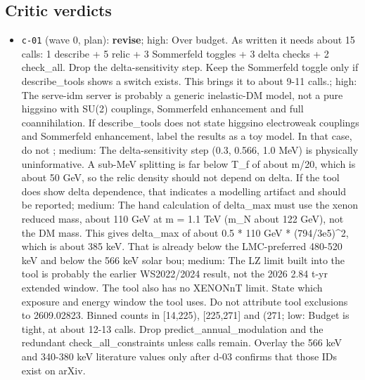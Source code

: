 \documentclass[11pt,a4paper]{article}
\begin{document}
\subsection{Critic verdicts}
\begin{itemize}
  \item \texttt{c-01} (wave 0, plan): \textbf{revise}; high: Over budget. As written it needs about 15 calls: 1 describe + 5 relic + 3 Sommerfeld toggles + 3 delta checks + 2 check\_all. Drop the delta-sensitivity step. Keep the Sommerfeld toggle only if describe\_tools shows a switch exists. This brings it to about 9-11 calls.; high: The serve-idm server is probably a generic inelastic-DM model, not a pure higgsino with SU(2) couplings, Sommerfeld enhancement and full coannihilation. If describe\_tools does not state higgsino electroweak couplings and Sommerfeld enhancement, label the results as a toy model. In that case, do not ; medium: The delta-sensitivity step (0.3, 0.566, 1.0 MeV) is physically uninformative. A sub-MeV splitting is far below T\_f of about m/20, which is about 50 GeV, so the relic density should not depend on delta. If the tool does show delta dependence, that indicates a modelling artifact and should be reported; medium: The hand calculation of delta\_max must use the xenon reduced mass, about 110 GeV at m = 1.1 TeV (m\_N about 122 GeV), not the DM mass. This gives delta\_max of about 0.5 * 110 GeV * (794/3e5)\textasciicircum{}2, which is about 385 keV. That is already below the LMC-preferred 480-520 keV and below the 566 keV solar bou; medium: The LZ limit built into the tool is probably the earlier WS2022/2024 result, not the 2026 2.84 t-yr extended window. The tool also has no XENONnT limit. State which exposure and energy window the tool uses. Do not attribute tool exclusions to 2609.02823. Binned counts in [14,225), [225,271] and (271; low: Budget is tight, at about 12-13 calls. Drop predict\_annual\_modulation and the redundant check\_all\_constraints unless calls remain. Overlay the 566 keV and 340-380 keV literature values only after d-03 confirms that those IDs exist on arXiv.

\end{itemize}
\end{document}
